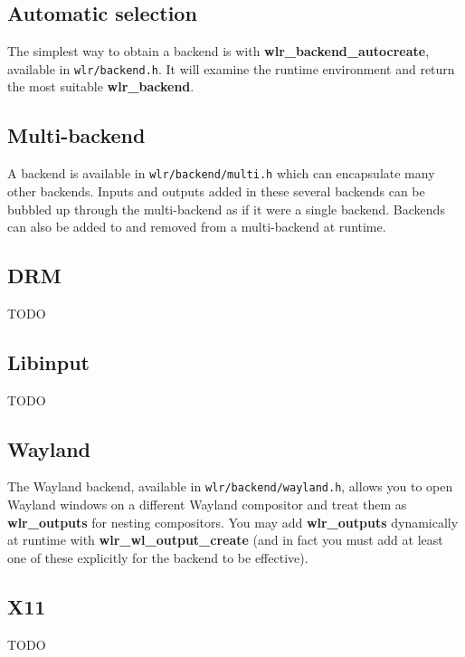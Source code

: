 \documentclass{article}
\newcommand{\code}[1]{\texttt{#1}}
\begin{document}
\subsection{Automatic selection}\label{backend autocreate}

The simplest way to obtain a backend is with \textbf{wlr_backend_autocreate},
available in \code{wlr/backend.h}. It will examine the runtime environment and
return the most suitable \textbf{wlr_backend}.

\subsection{Multi-backend}\label{multi backend}

A backend is available in \code{wlr/backend/multi.h} which can encapsulate many
other backends. Inputs and outputs added in these several backends can be
bubbled up through the multi-backend as if it were a single backend. Backends
can also be added to and removed from a multi-backend at runtime.

\subsection{DRM}\label{drm backend}

TODO

\subsection{Libinput}\label{libinput backend}

TODO

\subsection{Wayland}\label{wl backend}

The Wayland backend, available in \code{wlr/backend/wayland.h}, allows you to
open Wayland windows on a different Wayland compositor and treat them as
\textbf{wlr_outputs} for nesting compositors. You may add \textbf{wlr_outputs}
dynamically at runtime with \textbf{wlr_wl_output_create} (and in fact you must
add at least one of these explicitly for the backend to be effective).

\subsection{X11}\label{x11 backend}

TODO
\end{document}
